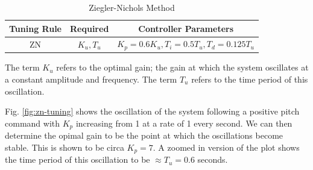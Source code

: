\documentclass[12pt]{article}
\begin{document}
\begin{table}[h]
    \centering
    \begin{tabular}{c|c|c}
        \hline
        Tuning Rule & Required & Controller Parameters \\
        \hline
        ZN & \(K_u, T_u\) & \(K_p = 0.6K_u, T_i = 0.5T_u, T_d = 0.125T_u\) \\
        \hline
    \end{tabular}
    \caption{Ziegler-Nichols Method}
    \label{tab:zn}
\end{table}

The term $K_u$ refers to the optimal gain; the gain at which the system oscillates at a constant amplitude and frequency. The term $T_u$ refers to the time period of this oscillation.

Fig. \ref{fig:zn-tuning} shows the oscillation of the system following a positive pitch command with $K_p$ increasing from 1 at a rate of 1 every second. We can then determine the opimal gain to be the point at which the oscillations become stable. This is shown to be circa $K_p = 7$. A zoomed in version of the plot shows the time period of this oscillation to be $\approx T_u = 0.6$ seconds.
\end{document}
